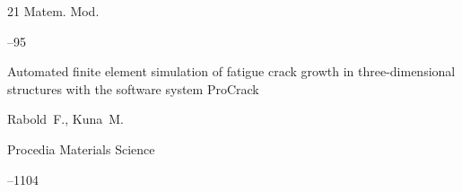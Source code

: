 \begin{thebibliography}{21}
\jour Matem. Mod.




--95




\paper Automated finite element simulation of fatigue crack growth in three-dimensional structures with the software system ProCrack

\by Rabold~F., Kuna~M.

\jour Procedia Materials Science



--1104




\end{thebibliography}



\EngDate











